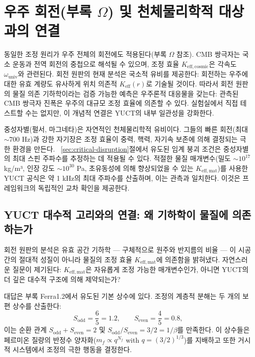 \documentclass[12pt,a4paper]{article}
\begin{document}
	\section{우주 회전(부록 \(\Omega\)) 및 천체물리학적 대상과의 연결}
	\label{sec:cosmic}
	
	동일한 조정 원리가 우주 전체의 회전에도 적용된다(부록 \(\Omega\) 참조). CMB 쌍극자는 국소 운동과 전역 회전의 중첩으로 해석될 수 있으며, 조정 효율 \(K_{\mathrm{eff,cosmic}}\)은 각속도 \(\omega_{\text{univ}}\)와 관련된다. 회전 원판의 현재 분석은 국소적 유비를 제공한다: 회전하는 우주에 대한 유효 계량도 유사하게 위치 의존적 \(K_{\mathrm{eff}}(r)\)로 기술될 것이다. 따라서 회전 원판의 물질 의존 기하학이라는 검증 가능한 예측은 우주론적 대응물을 갖는다: 관측된 CMB 쌍극자 진폭은 우주의 대규모 조정 효율에 의존할 수 있다. 실험실에서 직접 테스트할 수는 없지만, 이 개념적 연결은 YUCT의 내부 일관성을 강화한다.
	
	중성자별(펄서, 마그네타)은 자연적인 천체물리학적 유비이다. 그들의 빠른 회전(최대 \(\sim 700\) Hz)과 강한 자기장은 조정 효율이 중력, 핵력, 자기속 보존에 의해 결정되는 극한 환경을 만든다. ~\ref{sec:critical-disruption}절에서 유도된 임계 붕괴 조건은 중성자별의 최대 스핀 주파수를 추정하는 데 적용될 수 있다. 적절한 물질 매개변수(밀도 \(\sim 10^{17}\) kg/m³, 인장 강도 \(\sim 10^{30}\) Pa, 초유동성에 의해 향상되었을 수 있는 \(K_{\mathrm{eff,mat}}\))를 사용한 YUCT 공식은 약 1 kHz의 최대 주파수를 산출하며, 이는 관측과 일치한다. 이것은 프레임워크의 독립적인 교차 확인을 제공한다.
	
	\subsection{YUCT 대수적 고리와의 연결: 왜 기하학이 물질에 의존하는가}
	\label{subsec:ehrenfest-algebraic-loop}
	
	회전 원판의 분석은 유효 공간 기하학 — 구체적으로 원주와 반지름의 비율 — 이 시공간의 절대적 성질이 아니라 물질의 조정 효율 \(K_{\mathrm{eff,mat}}\)에 의존함을 밝혀냈다. 자연스러운 질문이 제기된다: \(K_{\mathrm{eff,mat}}\)은 자유롭게 조정 가능한 매개변수인가, 아니면 YUCT의 더 깊은 대수적 구조에 의해 제약되는가?
	
	대답은 부록 Ferra1.2에서 유도된 기본 상수에 있다. 조정의 계층적 분해는 두 개의 보편 상수를 산출한다:
	\[
	S_{\mathrm{odd}} = \frac{6}{5} = 1.2,\qquad S_{\mathrm{even}} = \frac{4}{5} = 0.8,
	\]
	이는 순환 관계 \(S_{\mathrm{odd}}+S_{\mathrm{even}}=2\) 및 \(S_{\mathrm{odd}}/S_{\mathrm{even}} = 3/2 = 1/\beta\)를 만족한다. 이 상수들은 페르미온 질량의 반정수 양자화(\(m_f \propto q^{N_f}\) with \(q = (3/2)^{1/3}\))를 지배하고 또한 거시적 시스템에서 조정의 극한 행동을 결정한다.
	
\end{document}
